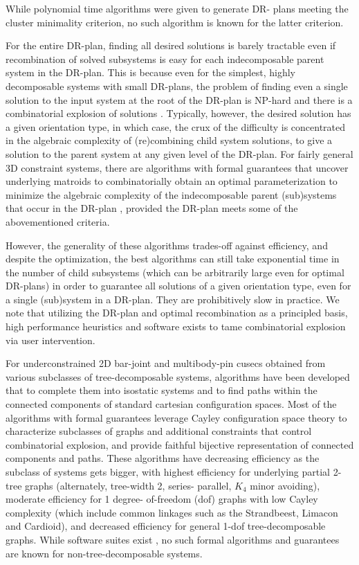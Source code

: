 While polynomial time algorithms were given \cite{XX} to generate DR-
plans meeting the cluster minimality criterion, no such algorithm is
known for the latter criterion.


For the entire DR-plan, finding all desired solutions is barely
tractable even if recombination of solved subsystems is easy for each
indecomposable parent system in the DR-plan. This is because even for
the simplest, highly decomposable systems with small DR-plans, the
problem of finding even a single solution to the input system at the
root of the DR-plan is NP-hard \cite{XX} and there is a combinatorial
explosion of solutions \cite{XX}. Typically, however, the desired
solution has a given orientation type, in which case, the crux of the
difficulty is concentrated in the algebraic complexity of
(re)combining child system solutions, to give a solution to the parent
system at any given level of the DR-plan. For fairly general 3D
constraint systems, there are algorithms with formal guarantees that
uncover underlying matroids to combinatorially obtain an optimal
parameterization to minimize the algebraic complexity of the
indecomposable parent (sub)systems that occur in the DR-plan \cite{XX,
XX,XX}, provided the DR-plan meets some of the abovementioned
criteria.

However, the generality of these algorithms trades-off against
efficiency, and despite the optimization, the best algorithms can
still take exponential time in the number of child subsystems (which
can be arbitrarily large even for optimal DR-plans) in order to
guarantee all solutions of a given orientation type, even for a single
(sub)system in a DR-plan. They are prohibitively slow in practice. We
note that utilizing the DR-plan and optimal recombination as a
principled basis, high performance heuristics and software exists
\cite{XX,XX} to tame combinatorial explosion via user intervention.


For underconstrained 2D bar-joint and multibody-pin cusecs obtained
from various subclasses of tree-decomposable systems, algorithms have
been developed \cite{XX, XX} that to complete them into isostatic
systems \cite{XX, XX} and to find paths within the connected
components \cite{XX,XX} of standard cartesian configuration spaces.
Most of the algorithms with formal guarantees leverage Cayley
configuration space theory \cite{XX,XX} to characterize subclasses of
graphs and additional constraints that control combinatorial
explosion, and provide faithful bijective representation of connected
components and paths. These algorithms have decreasing efficiency as
the subclass of systems gets bigger,  with highest efficiency for
underlying partial 2-tree graphs (alternately, tree-width 2, series-
parallel, $K_4$ minor avoiding), moderate efficiency for 1 degree-
of-freedom (dof) graphs with low Cayley complexity (which include
common linkages such as the Strandbeest, Limacon and Cardioid), and
decreased efficiency for general 1-dof tree-decomposable graphs. While
software suites exist \cite{XX,XX}, no such formal algorithms and
guarantees are known for non-tree-decomposable systems.
%
